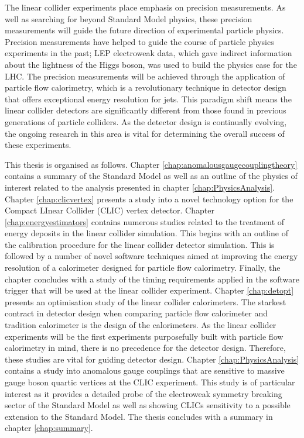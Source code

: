 The linear collider experiments place emphasis on precision measurements.  As well as searching for beyond Standard Model physics, these precision measurements will guide the future direction of experimental particle physics.  Precision measurements have helped to guide the course of particle physics experiments in the past; LEP electroweak data, which gave indirect information about the lightness of the Higgs boson, was used to build the physics case for the LHC.  The precision measurements will be achieved through the application of particle flow calorimetry, which is a revolutionary technique in detector design that offers exceptional energy resolution for jets.  This paradigm shift means the linear collider detectors are significantly different from those found in previous generations of particle colliders.  As the detector design is continually evolving, the ongoing research in this area is vital for determining the overall success of these experiments.  

This thesis is organised as follows.  Chapter \ref{chap:anomalousgaugecouplingtheory} contains a summary of the Standard Model as well as an outline of the physics of interest related to the analysis presented in chapter \ref{chap:PhysicsAnalysis}.  Chapter \ref{chap:clicvertex} presents a study into a novel technology option for the Compact LInear Collider (CLIC) vertex detector.  Chapter \ref{chap:energyestimators} contains numerous studies related to the treatment of energy deposits in the linear collider simulation.  This begins with an outline of the calibration procedure for the linear collider detector simulation.  This is followed by a number of novel software techniques aimed at improving the energy resolution of a calorimeter designed for particle flow calorimetry.  Finally, the chapter concludes with a study of the timing requirements applied in the software trigger that will be used at the linear collider experiment.  Chapter \ref{chap:detopt} presents an optimisation study of the linear collider calorimeters.  The starkest contract in detector design when comparing particle flow calorimeter and tradition calorimeter is the design of the calorimeters.  As the linear collider experiments will be the first experiments purposefully built with particle flow calorimetry in mind, there is no precedence for the detector design.  Therefore, these studies are vital for guiding detector design.  Chapter \ref{chap:PhysicsAnalysis} contains a study into anomalous gauge couplings that are sensitive to massive gauge boson quartic vertices at the CLIC experiment.  This study is of particular interest as it provides a detailed probe of the electroweak symmetry breaking sector of the Standard Model as well as showing CLICs sensitivity to a possible extension to the Standard Model.  The thesis concludes with a summary in chapter \ref{chap:summary}.

